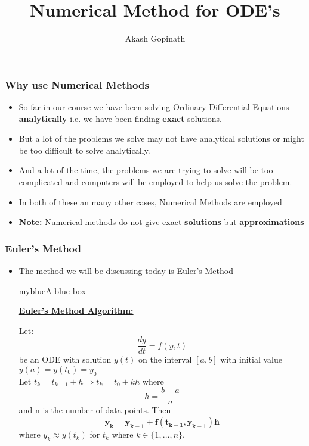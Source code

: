\documentclass[10pt]{beamer}
\title[Numerical Methods]{Numerical Method for ODE's}
\author[Akash Gopinath]{Akash Gopinath}
\institute[Maths, York]{University of York, UK }
\begin{document}
	
	\maketitle
	
	\begin{frame}
		\frametitle{Why use Numerical Methods}
		\begin{itemize}
			\item So far in our course we have been solving Ordinary Differential Equations \textbf{analytically} i.e. we have been finding {\bf exact} solutions.
			
			\vspace{5px}
			
			\item But a lot of the problems we solve may not have analytical solutions or might be too difficult to solve analytically.
			
			\vspace{5px}
			
			\item And a lot of the time, the problems we are trying to solve will be too complicated and computers will be employed to help us solve the problem.
			
			\vspace{5px}
			
			\item In both of these an many other cases, Numerical Methods are employed
			
			\vspace{5px}
			
			\item {\bf Note:} Numerical methods do not give exact {\bf solutions} but {\bf approximations}
		\end{itemize}
	\end{frame}


	\begin{frame}
		\frametitle{Euler's Method}
		\begin{itemize}
			\item The method we will be discussing today is Euler's Method
				\begin{mybox}{myblue}{A blue box}
			\begin{center}
				\underline{\textbf{Euler's Method Algorithm:}}
			\end{center}
			Let:
			$$\frac{dy}{dt} = f(y,t)$$
			be an ODE with solution $y(t)$ on the interval $[a,b]$ with initial value $y(a) = y(t_0) = y_0$\\
			Let $\displaystyle t_k = t_{k-1} + h  \Rightarrow t_k = t_0 + kh$ where $$\displaystyle h = \frac{b-a}{n}$$ and n is the number of data points. Then
			$$\boldsymbol{y_k = y_{k-1} + f(t_{k-1}, y_{k-1})h}$$
			where $y_k \approx y(t_k)$ for $t_k$ where $k \in \{1, \ldots, n\}$.
			\end{mybox}
		\end{itemize}
	\end{frame}
\end{document}
